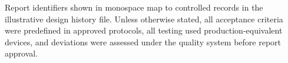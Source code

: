 \begin{noticebox}[title={\bfseries Submission conventions}]
\small Report identifiers shown in monospace map to controlled records in the illustrative design history file. Unless otherwise stated, all acceptance criteria were predefined in approved protocols, all testing used production-equivalent devices, and deviations were assessed under the quality system before report approval.
\end{noticebox}

\clearpage
\tableofcontents
\clearpage
{}

